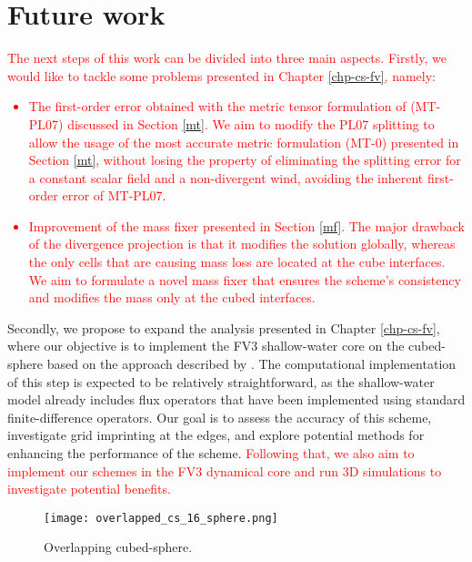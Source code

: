\section{Future work}
\textcolor{red}{
The next steps of this work can be divided into three main aspects.
Firstly, we would like to tackle some problems presented in Chapter \ref{chp-cs-fv}, namely:
\begin{itemize}
	\item The first-order error obtained with the metric tensor formulation of \citet{putman:2007} (MT-PL07) discussed in Section \ref{mt}.
	We aim to modify the PL07 splitting to allow the usage of the most accurate metric formulation (MT-0) presented in Section \ref{mt},
	without losing the property of eliminating the splitting error for a constant scalar field and a non-divergent wind, avoiding
	the inherent first-order error of MT-PL07.
	\item Improvement of the mass fixer presented in Section \ref{mf}. The major drawback of the divergence projection is that it modifies the solution globally,
	whereas the only cells that are causing mass loss are located at the cube interfaces.
	We aim to formulate a novel mass fixer that ensures the scheme's consistency and modifies the mass only at the cubed interfaces.
\end{itemize}
}

Secondly, we propose to expand the analysis presented in Chapter \ref{chp-cs-fv},
where our objective is to implement the FV3 shallow-water core on the cubed-sphere based on the approach described by \citet{lin:1997}.
The computational implementation of this step is expected to be relatively straightforward,
as the shallow-water model already includes flux operators that have been implemented using
standard finite-difference operators. Our goal is to assess the accuracy of this scheme,
investigate grid imprinting at the edges, and explore potential methods for enhancing the performance of the scheme.
\textcolor{red}{Following that, we also aim to implement our schemes in the FV3 dynamical core and run 3D simulations to investigate potential benefits.}
\begin{figure}[!htb]
	\centering
	\texttt{[image: overlapped\_cs\_16\_sphere.png]}
	\caption{Overlapping cubed-sphere.\label{gridoverlaped}}
\end{figure}

